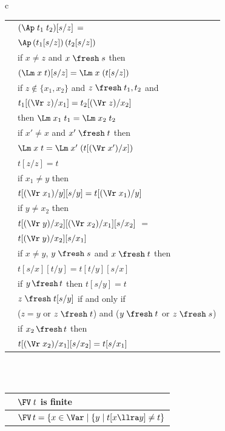 \begin{figure}
{\begin{tabular}{c}
\begin{tabular}{|c|l|}
	\\\hline 
	\textrm{\SbAp}  & 
	$(\Ap\;t_1\;t_2)[s / z] \,=$ 
	\\&
	$ \Ap\,(t_1[s / z])\,(t_2[s / z])$
	\\\hline 
	\textrm{\SbLm}  & if $x \not= z$ and $x\;\fresh\;s$ then 
	\\&$(\Lm\;x\;t)[s / z] = \Lm\;x\;(t[s / z])$
	\\\hline 
	\textrm{\SbCg}  &
	if $z \not\in \{x_1,x_2\}$ and 
	$z\;\fresh\;t_1,t_2$ and 
	\\& 
	$t_1[(\Vr\;z) / x_1] = t_2[(\Vr\;z) / x_2]$ 
	\\&then 
	$\Lm\;x_1\;t_1 = \Lm\;x_2\;t_2$
	\\\hline 
	\textrm{\SbBvr}  &	
	if $x' \not= x$ and 
	$x'\;\fresh\;t$ then 
	\\&
	$\Lm\;x\;t = \Lm\;x'\;(t[(\Vr\;x') / x])$
		\\\hline 
	\textrm{\SbId}
	&
	$t[z / z] = t$
	\\\hline
	\textrm{\SbIm} 
	& if $x_1\not=y$ then 
	\\& $t[(\Vr\;x_1)/y][s/y]= t[(\Vr\;x_1)/y]$
	\\\hline 
	\textrm{\SbCh}  & if $y\not=x_2$ then 
	\\&$t[(\Vr\;y)/x_2][(\Vr\;x_2)/x_1][s/x_2]$ $= $ 
	\\& $t[(\Vr\;y)/x_2] [s/x_1]$
	\\\hline 
	\textrm{\SbCm}  & if $x \not= y$, 
	$y \;\fresh\; s$ and $x \;\fresh\; t$
	then 
	\\&$t[s/x] [t/y] = t[t/y][s/x]$
	\\\hline 
	\textrm{\SbFr} 
	& if $y \,\fresh\, t$ then $t[s/y]= t$
	\\\hline 
	\textrm{\FrSb} 
	&
	$z \;\fresh\;t [s / y]$ if and only if    
	\\&($z = y$ or $z \;\fresh\;t$) and ($y \;\fresh\;t$ or $z \;\fresh\; s$) 
	\\\hline 
	\textrm{\SbChFr}  & if $x_2 \,\fresh\, t$ then 
	\\&$t[(\Vr\;x_2)/x_1][s/x_2] = t[s/x_1]$
	\\\hline 
\end{tabular} 
\\ \\ \vspace*{-0.5ex}
\begin{tabular}{|c|l|}	
	\hline 	
	\textrm{\FSupFv}  	& 
	 $\FV\;t$ is finite
	\\\hline 
	\textrm{\FvDPm}  &
	$\FV\,t =  \{x\in \Var \mid \{y \mid t[x \llra  y] \not= t\}$ 

\end{tabular}
\end{tabular}}
\end{figure}
